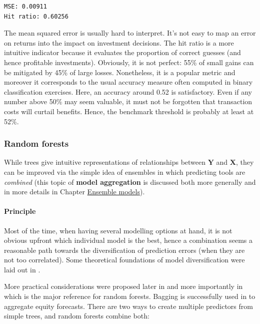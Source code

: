 \begin{verbatim}
MSE: 0.00911
Hit ratio: 0.60256
\end{verbatim}

The mean squared error is usually hard to interpret. It's not easy to map an error on returns into the impact on investment decisions. The hit ratio is a more intuitive indicator because it evaluates the proportion of correct guesses (and hence profitable investments). Obviously, it is not perfect: 55\% of small gains can be mitigated by 45\% of large losses. Nonetheless, it is a popular metric and moreover it corresponds to the usual accuracy measure often computed in binary classification exercises. Here, an accuracy around 0.52 is satisfactory. Even if any number above 50\% may seem valuable, it must not be forgotten that transaction costs will curtail benefits. Hence, the benchmark threshold is probably at least at 52\%.

\subsubsection{Random forests}

While trees give intuitive representations of relationships between $\mathbf{Y}$ and $\mathbf{X}$, they can be improved via the simple idea of ensembles in which predicting tools are \textit{combined} (this topic of \textbf{model aggregation} is discussed both more generally and in more details in Chapter \href{/chap-14-ensemble}{Ensemble models}).

\paragraph{Principle}

Most of the time, when having several modelling options at hand, it is not obvious upfront which individual model is the best, hence a combination seems a reasonable path towards the diversification of prediction errors (when they are not too correlated). Some theoretical foundations of model diversification were laid out in \cite{schapire1990strength}.

More practical considerations were proposed later in \cite{ho1995random} and more importantly in \cite{breiman2001random} which is the major reference for random forests. Bagging is successfully used in \cite{yin2020equity} to aggregate equity forecasts. There are two ways to create multiple predictors from simple trees, and random forests combine both:

